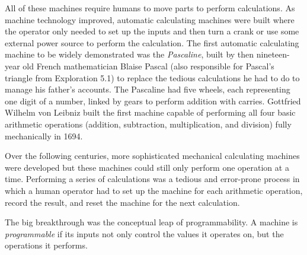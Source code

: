 \begin{schemeregion}
All of these machines require humans to move parts to perform calculations.  As machine technology improved, automatic calculating machines were built where the operator only needed to set up the inputs and then turn a crank or use some external power source to perform the calculation.  
The first automatic calculating machine to be widely demonstrated was the {\em Pascaline},  built by then nineteen-year old French mathematician Blaise Pascal (also responsible for Pascal's triangle from Exploration 5.1\LATER{\ref{excur:pascal}}) to replace the tedious calculations he had to do to manage his father's accounts.  The Pascaline had five wheels, each representing one digit of a number, linked by gears to perform addition with carries.  %
Gottfried Wilhelm von Leibniz built the first machine capable of performing all four basic arithmetic operations (addition, subtraction, multiplication, and division) fully mechanically in 1694.

Over the following centuries, more sophisticated mechanical calculating machines were developed but these machines could still only perform one operation at a time.  Performing a series of calculations was a tedious and error-prone process in which a human operator had to set up the machine for each arithmetic operation, record the result, and reset the machine for the next calculation.

The big breakthrough was the conceptual leap of programmability.  A machine is \emph{programmable} if its inputs not only control the values it operates on, but the operations it performs.  


\end{schemeregion}
